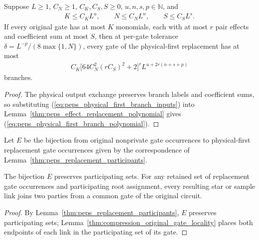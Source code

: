 \begin{lemma}
    \label{thm:peps_physical_first_branch_polynomial}
    \leanok
    Suppose $L\ge1$, $C_N\ge1$, $C_K,C_S,S\ge0$, $u,n,s,p\in\mathbb N$, and
    \begin{align}
        K\le C_KL^u,\qquad N\le C_NL^n,\qquad S\le C_SL^s.
        \label{eq:peps_physical_first_branch_inputs}
    \end{align}
    If every original gate has at most $K$ monomials, each with at most $r$
    pair effects and coefficient sum at most $S$, then at per-gate tolerance
    $\delta=L^{-p}/(8\max\{1,N\})$, every gate of the physical-first
    replacement has at most
    \begin{align}
        C_K\bigl[64C_N^2(rC_S)^2+2\bigr]^r
        L^{u+2r(n+s+p)}
        \label{eq:peps_physical_first_branch_polynomial}
    \end{align}
    branches.
\end{lemma}
\begin{proof}
    \leanok
    The physical output exchange preserves branch labels and coefficient
    sums, so substituting (\ref{eq:peps_physical_first_branch_inputs}) into
    Lemma~\ref{thm:peps_effect_replacement_polynomial} gives
    (\ref{eq:peps_physical_first_branch_polynomial}).
\end{proof}

\begin{definition}
    \label{def:peps_physical_first_original_locality}
    \leanok
    Let $E$ be the bijection from original nonprivate gate occurrences to
    physical-first replacement gate occurrences given by the
    correspondence of Lemma~\ref{thm:peps_replacement_participants}.
\end{definition}

\begin{lemma}
    \label{thm:peps_physical_first_original_locality}
    \leanok
    The bijection $E$ preserves participating sets. For any retained set of
    replacement gate occurrences and participating root assignment, every
    resulting star or sample link joins two parties from a common gate of
    the original circuit.
\end{lemma}
\begin{proof}
    \leanok
    By Lemma~\ref{thm:peps_replacement_participants}, $E$ preserves
    participating sets; Lemma~\ref{thm:compression_original_gate_locality}
    places both endpoints of each link in the participating set of its
    gate.
\end{proof}

